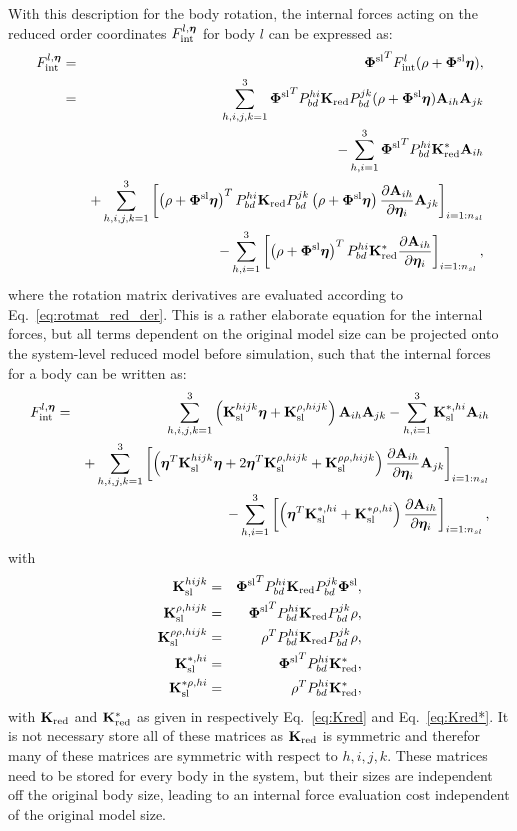 With this description for the body rotation, the internal forces acting on the reduced order coordinates $F_{\mathrm{int}}^{l,\bm \eta}$ for body $l$ can be expressed as:
\begin{eqnarray}
F_{\mathrm{int}}^{l,\bm \eta} & = & {\bm \Phi^{\rm sl}}^TF_{\mathrm{int}}^l(\rho + \bm \Phi^{\rm sl}\bm \eta), \\
&=& \sum_{h,i,j,k=1}^{3} {\bm \Phi^{\rm sl}}^TP^{hi}_{bd}\mathbf K_{\rm red} P^{jk}_{bd}(\rho+\bm \Phi^{\rm sl}\bm \eta)\mathbf A_{ih}\mathbf A_{jk} \nonumber \\
&& -\sum_{h,i=1}^{3} {\bm \Phi^{\rm sl}}^TP^{hi}_{bd}\mathbf K_{\rm red}^*\mathbf A_{ih} \nonumber \\
&& + \sum_{h,i,j,k=1}^{3}\left[\left(\rho+\bm \Phi^{\rm sl}\bm \eta\right)^TP^{hi}_{bd}\mathbf K_{\rm red} P^{jk}_{bd}\left(\rho+\bm \Phi^{\rm sl}\bm \eta\right)\frac{\partial\mathbf A_{ih}}{\partial\bm \eta_i}\mathbf A_{jk}\right]_{i=1:n_{sl}} \nonumber \\
&& - \sum_{h,i=1}^{3}\left[\left(\rho+\bm \Phi^{\rm sl}\bm \eta\right)^TP^{hi}_{bd}\mathbf K_{\rm red}^*\frac{\partial\mathbf A_{ih}}{\partial\bm \eta_i}\right]_{i=1:n_{sl}},
\end{eqnarray}
where the rotation matrix derivatives are evaluated according to Eq.~\eqref{eq:rotmat_red_der}.
This is a rather elaborate equation for the internal forces, but all terms dependent on the original model size can be projected onto the system-level reduced model before simulation, such that the internal forces for a body can be written as:
\begin{eqnarray}
F_{\mathrm{int}}^{l,\bm \eta} &=& \sum_{h,i,j,k=1}^{3} \left(\mathbf K_{\rm sl}^{hijk}\bm \eta + \mathbf K_{\rm sl}^{\rho,hijk}\right)\mathbf A_{ih}\mathbf A_{jk} -\sum_{h,i=1}^{3} \mathbf K_{\rm sl}^{*,hi}\mathbf A_{ih} \nonumber \\
&& + \sum_{h,i,j,k=1}^{3}\left[\left(\bm \eta^T\mathbf K_{\rm sl}^{hijk}\bm \eta+2\bm \eta^T\mathbf K_{\rm sl}^{\rho,hijk}+\mathbf K_{\rm sl}^{\rho\rho,hijk}\right)\frac{\partial\mathbf A_{ih}}{\partial\bm \eta_i}\mathbf A_{jk}\right]_{i=1:n_{sl}} \nonumber \\
&& - \sum_{h,i=1}^{3}\left[\left(\bm \eta^T\mathbf K_{\rm sl}^{*,hi} + \mathbf K_{\rm sl}^{*\rho,hi}\right)\frac{\partial\mathbf A_{ih}}{\partial\bm \eta_i}\right]_{i=1:n_{sl}},
\end{eqnarray}
with
\begin{eqnarray}
\mathbf K_{\rm sl}^{hijk} &=& {\bm \Phi^{\rm sl}}^TP^{hi}_{bd}\mathbf K_{\rm red} P^{jk}_{bd}\bm \Phi^{\rm sl}, \\
\mathbf K_{\rm sl}^{\rho,hijk} &=& {\bm \Phi^{\rm sl}}^TP^{hi}_{bd}\mathbf K_{\rm red} P^{jk}_{bd}\rho, \\
\mathbf K_{\rm sl}^{\rho\rho,hijk} &=& \rho^TP^{hi}_{bd}\mathbf K_{\rm red} P^{jk}_{bd}\rho, \\
\mathbf K_{\rm sl}^{*,hi} &=& {\bm \Phi^{\rm sl}}^TP^{hi}_{bd}\mathbf K_{\rm red}^*, \\
\mathbf K_{\rm sl}^{*\rho,hi} &=& \rho^TP^{hi}_{bd}\mathbf K_{\rm red}^*,
\end{eqnarray}
with $\mathbf K_{\rm red}$ and $\mathbf K_{\rm red}^*$ as given in respectively Eq.~\eqref{eq:Kred} and Eq.~\eqref{eq:Kred*}. 
It is not necessary store all of these matrices as $\mathbf K_{\rm red}$ is symmetric and therefor many of these matrices are symmetric with respect to $h,i,j,k$. These matrices need to be stored for every body in the system, but their sizes are independent off the original body size, leading to an internal force evaluation cost independent of the original model size. 
 
